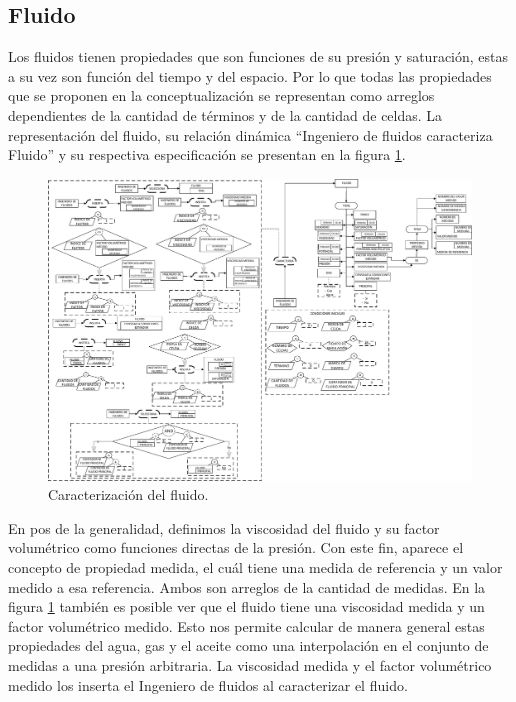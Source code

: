 \subsection{Fluido}\label{sec:PS_Phase}

Los fluidos tienen propiedades que son funciones de su presión y saturación, estas a su vez son función del tiempo y del espacio. Por lo que todas las propiedades que se proponen en la conceptualización se representan como arreglos dependientes de la cantidad de términos y de la cantidad de celdas. La representación del fluido, su relación dinámica ``Ingeniero de fluidos caracteriza Fluido'' y su respectiva especificación se presentan en la figura \ref{fig:Fluid}.\\

\begin{figure}[h]
	\centering%
	\includegraphics[width=0.9\linewidth]{Kap4/Fluid.pdf}%
	\caption{Caracterización del fluido.} \label{fig:Fluid}
\end{figure}

En pos de la generalidad, definimos la viscosidad del fluido y su factor volumétrico como funciones directas de la presión. Con este fin, aparece el concepto de propiedad medida, el cuál tiene una medida de referencia y un valor medido a esa referencia. Ambos son arreglos de la cantidad de medidas. En la figura \ref{fig:Fluid} también es posible ver que el fluido tiene una viscosidad medida y un factor volumétrico medido. Esto nos permite calcular de manera general estas propiedades del agua, gas y el aceite como una interpolación en el conjunto de medidas a una presión arbitraria. La viscosidad medida y el factor volumétrico medido los inserta el Ingeniero de fluidos al caracterizar el fluido. \\

